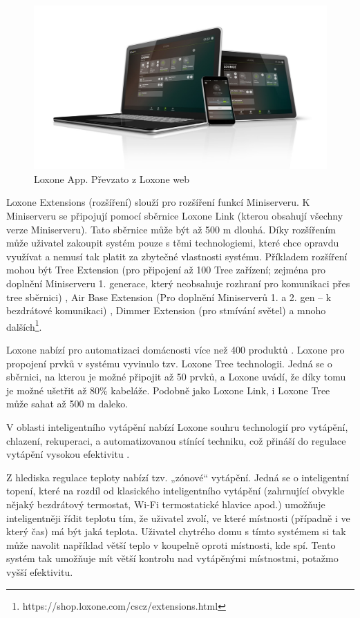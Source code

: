\begin{figure}[hbt]
	\centering
	\includegraphics{obrazky/loxone-app.jpg}
	\caption{Loxone App. Převzato z Loxone web}
	\label{loxone-app}
\end{figure}

Loxone Extensions (rozšíření) slouží pro rozšíření funkcí Miniserveru. K Miniserveru se připojují pomocí sběrnice Loxone Link (kterou obsahují všechny verze Miniserveru). Tato sběrnice může být až 500 m dlouhá. Díky rozšířením může uživatel zakoupit systém pouze s těmi technologiemi, které chce opravdu využívat a nemusí tak platit za zbytečné vlastnosti systému. Příkladem rozšíření mohou být Tree Extension (pro připojení až 100 Tree zařízení; zejména pro doplnění Miniserveru 1. generace, který neobsahuje rozhraní pro komunikaci přes tree sběrnici) \cite{TreeDatasheet}, Air Base Extension (Pro doplnění Miniserverů 1. a 2. gen – k bezdrátové komunikaci) \cite{AirBaseExtensionDatasheet}, Dimmer Extension (pro stmívání světel) \cite{DimmerExtensionDatasheet} a mnoho dalších\footnote{https://shop.loxone.com/cscz/extensions.html}.

Loxone nabízí pro automatizaci domácnosti více než 400 produktů \cite{ReseniLoxone}.
Loxone pro propojení prvků v systému vyvinulo tzv. Loxone Tree technologii. Jedná se o sběrnici, na kterou je možné připojit až 50 prvků, a Loxone uvádí, že díky tomu je možné ušetřit až 80\% kabeláže. Podobně jako Loxone Link, i Loxone Tree může sahat až 500 m daleko.

V oblasti inteligentního vytápění nabízí Loxone souhru technologií pro vytápění, chlazení, rekuperaci, a automatizovanou stínící techniku, což přináší do regulace vytápění vysokou efektivitu \cite{RizeniKlimaLoxone}.

Z hlediska regulace teploty nabízí tzv. „zónové“ vytápění. Jedná se o inteligentní topení, které na rozdíl od klasického inteligentního vytápění (zahrnující obvykle nějaký bezdrátový termostat, Wi-Fi termostatické hlavice apod.) umožňuje inteligentněji řídit teplotu tím, že uživatel zvolí, ve které místnosti (případně i ve který čas) má být jaká teplota. Uživatel chytrého domu s tímto systémem si tak může navolit například větší teplo v koupelně oproti místnosti, kde spí. Tento systém tak umožňuje mít větší kontrolu nad vytápěnými místnostmi, potažmo vyšší efektivitu.

